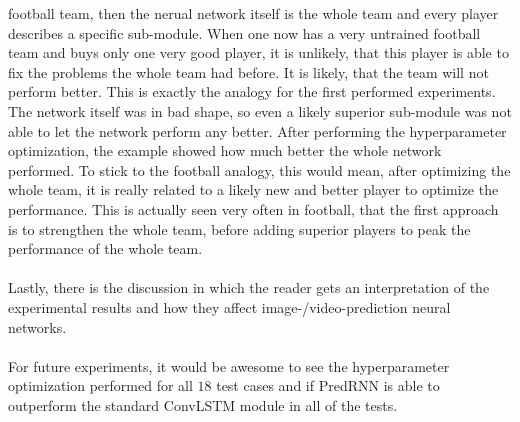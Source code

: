  football team, then the nerual network itself is the whole team and every player describes a specific sub-module. When one now has a very untrained football team
 and buys only one very good player, it is unlikely, that this player is able to fix the problems the whole team had before. It is likely, that the team will
 not perform better. This is exactly the analogy for the first performed experiments. The network itself was in bad shape, so even a likely superior
 sub-module was not able to let the network perform any better. After performing the hyperparameter optimization, the example showed how much better the
 whole network performed. To stick to the football analogy, this would mean, after optimizing the whole team, it is really related to a likely new and better 
 player to optimize the performance. This is actually seen very often in football, that the first approach is to strengthen the whole team, before adding superior
 players to peak the performance of the whole team. 
 \\\\
 Lastly, there is the discussion in which
 the reader gets an interpretation of the experimental results and how they affect image-/video-prediction neural networks.
 \\\\
 For future experiments, it would be awesome to see the hyperparameter optimization performed for all $18$ test cases and if PredRNN is able to outperform
 the standard ConvLSTM module in all of the tests.